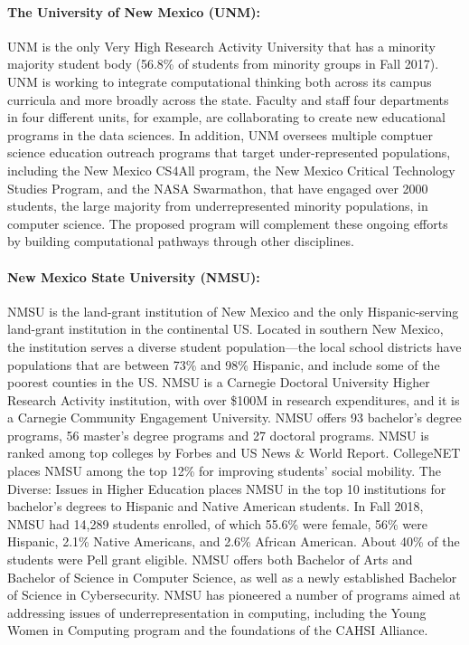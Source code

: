 \paragraph{The University of New Mexico (UNM):}

UNM is the only Very High Research Activity University that has a minority majority student body (56.8\% of students from minority groups in Fall 2017). UNM is working to integrate computational thinking both across its campus curricula and more broadly across the state. Faculty and staff four departments in four different units, for example, are collaborating to create new educational programs in the data sciences. In addition, UNM oversees multiple comptuer science education outreach programs that target under-represented populations, including  the New Mexico CS4All program, the New Mexico Critical Technology Studies Program, and the NASA Swarmathon, that have engaged over 2000 students, the large majority from underrepresented minority populations, in computer science. The proposed program will complement these ongoing efforts by building computational pathways through other disciplines. 

\paragraph{New Mexico State University (NMSU):}
NMSU is the land-grant institution of New Mexico and the only Hispanic-serving land-grant institution in the continental US. Located in southern New Mexico, the institution serves a diverse student population---the local school districts have populations that are between 73\% and 98\% Hispanic, and include some of
the poorest counties in the US. NMSU is a Carnegie Doctoral University Higher Research Activity institution, with over \$100M in research expenditures, and it is a Carnegie Community Engagement University. NMSU offers 93 bachelor's degree programs, 56 master's degree programs and 27 doctoral programs. NMSU is ranked among top colleges by Forbes and US News \& World Report. CollegeNET places NMSU among the top 12\% for improving students’ social mobility. The Diverse: Issues in Higher Education places NMSU
in the top 10 institutions for bachelor’s degrees to Hispanic and Native American students. 
In Fall 2018, NMSU had 14,289 students enrolled, of which 55.6\% were female, 56\% were Hispanic, 2.1\%
Native Americans, and 2.6\% African American. About 40\% of the students were Pell grant eligible.
NMSU offers both Bachelor of Arts and Bachelor of Science in Computer Science, as well as a newly established Bachelor of Science in Cybersecurity.  NMSU has pioneered a number of programs aimed at addressing issues of underrepresentation in computing, including the Young Women in Computing program and the foundations of the CAHSI Alliance.

